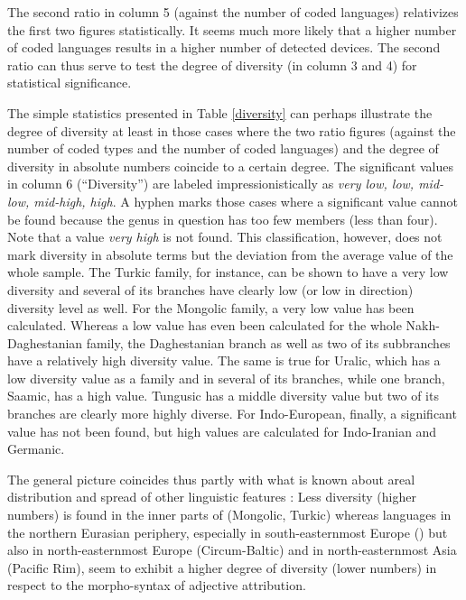 The second ratio in column 5 (against the number of coded languages) relativizes the first two figures statistically. It seems much more likely that a higher number of coded languages results in a higher number of detected devices. The second ratio can thus serve to test the degree of diversity (in column 3 and 4) for statistical significance. 

The simple statistics presented in Table \ref{diversity} can perhaps illustrate the degree of diversity at least in those cases where the two ratio figures (against the number of coded types and the number of coded languages) and the degree of diversity in absolute numbers coincide to a certain degree. The significant values in column 6 (“Diversity”) are labeled impressionistically as \textit{very low, low, mid-low, mid-high, high}. A hyphen marks those cases where a significant value cannot be found because the genus in question has too few members (less than four). Note that a value \textit{very high} is not found. This classification, however, does not mark diversity in absolute terms but the deviation from the average value of the whole sample. The Turkic family, for instance, can be shown to have a very low diversity and several of its branches have clearly low (or low in direction) 
 diversity level as well. For the Mongolic family, a very low value has been calculated. Whereas a low value has even been calculated for the whole Nakh-Daghestanian family, the Daghestanian branch as well as two of its subbranches have a relatively high diversity value. The same is true for Uralic, which has a low diversity value as a family and in several of its branches, while one branch, Saamic, has a high value. Tungusic has a middle diversity value but two of its branches are clearly more highly diverse. For Indo-European, finally, a significant value has not been found, but high values are calculated for Indo-Iranian and Germanic.

The general picture coincides thus partly with what is known about areal distribution and spread of other linguistic features \citep[cf., e.g.,][]{nichols1992}: Less diversity (higher numbers) is found in the inner parts of  (Mongolic, Turkic) whereas languages in the northern Eurasian periphery, especially in south-easternmost Europe () but also in north-easternmost Europe (Circum-Baltic) and in north-easternmost Asia (Pacific Rim), seem to exhibit a higher degree of diversity (lower numbers) in respect to the morpho-syntax of adjective attribution.


